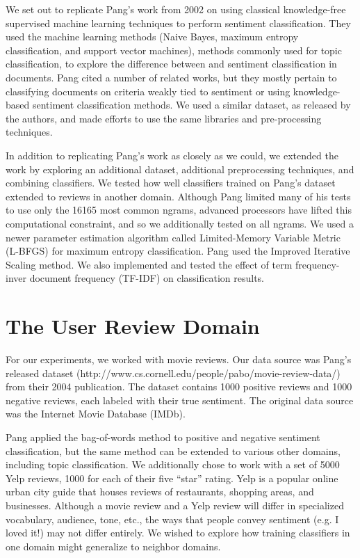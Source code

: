 \documentclass[10pt,twocolumn,letterpaper]{article}
\begin{document}
We set out to replicate Pang's work \cite{Pang} from 2002 on using classical knowledge-free supervised machine learning techniques to perform sentiment classification. They used the machine learning methods (Naive Bayes, maximum entropy classification, and support vector machines), methods commonly used for topic classification, to explore the difference between and sentiment classification in documents. Pang cited a number of related works, but they mostly pertain to classifying documents on criteria weakly tied to sentiment or using knowledge-based sentiment classification methods. We used a similar dataset, as released by the authors, and made efforts to use the same libraries and pre-processing techniques.

In addition to replicating Pang's work as closely as we could, we extended the work by exploring an additional dataset, additional preprocessing techniques, and combining classifiers. We tested how well classifiers trained on Pang's dataset extended to reviews in another domain. Although Pang limited many of his tests to use only the 16165 most common ngrams, advanced processors have lifted this computational constraint, and so we additionally tested on all ngrams. We used a newer parameter estimation algorithm called Limited-Memory Variable Metric (L-BFGS)\cite{Liu} for maximum entropy classification. Pang used the Improved Iterative Scaling method. We also implemented and tested the effect of term frequency-inver document frequency (TF-IDF) on classification results.


\section{The User Review Domain}
For our experiments, we worked with movie reviews. Our data source was Pang's released dataset (http://www.cs.cornell.edu/people/pabo/movie-review-data/) from their 2004 publication. The dataset contains 1000 positive reviews and 1000 negative reviews, each labeled with their true sentiment. The original data source was the Internet Movie Database (IMDb).

Pang applied the bag-of-words method to positive and negative sentiment classification, but the same method can be extended to various other domains, including topic classification. We additionally chose to work with a set of 5000 Yelp reviews, 1000 for each of their five “star” rating. Yelp is a popular online urban city guide that houses reviews of restaurants, shopping areas, and businesses. Although a movie review and a Yelp review will differ in specialized vocabulary, audience, tone, etc., the ways that people convey sentiment (e.g. I loved it!) may not differ entirely. We wished to explore how training classifiers in one domain might generalize to neighbor domains.
\end{document}
